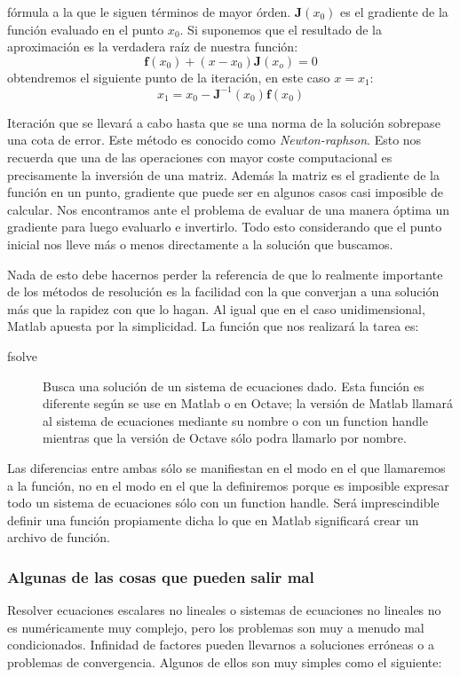 fórmula a la que le siguen términos de mayor órden.
$\mathbf{J}(x_{0})$ es el gradiente de la función evaluado en el punto
$x_{0}$. Si suponemos que el resultado de la aproximación es la
verdadera raíz de nuestra función:
$$
\mathbf{f}(x_{0})+(x-x_{0})\mathbf{J}(x_{o})=0$$ obtendremos el
siguiente punto de la iteración, en este caso $x=x_{1}$:
$$x_{1}=x_{0}-\mathbf{J}^{-1}(x_{0})\mathbf{f}(x_{0})$$


Iteración que se llevará a cabo hasta que se una norma de la solución
sobrepase una cota de error. Este método es conocido como
\emph{Newton-raphson}.  Esto nos recuerda que una de las operaciones
con mayor coste computacional es precisamente la inversión de una
matriz. Además la matriz es el gradiente de la función en un punto,
gradiente que puede ser en algunos casos casi imposible de calcular.
Nos encontramos ante el problema de evaluar de una manera óptima un
gradiente para luego evaluarlo e invertirlo. Todo esto considerando
que el punto inicial nos lleve más o menos directamente a la solución
que buscamos.

Nada de esto debe hacernos perder la referencia de que lo realmente
importante de los métodos de resolución es la facilidad con la que
converjan a una solución más que la rapidez con que lo hagan. Al igual
que en el caso unidimensional, Matlab apuesta por la simplicidad.  La
función que nos realizará la tarea es:

\begin{description}
\item [fsolve]Busca una solución de un sistema de
  ecuaciones dado. Esta función es diferente según se use en Matlab o
  en Octave; la versión de Matlab llamará al sistema de ecuaciones
  mediante su nombre o con un function handle mientras que la versión
  de Octave sólo podra llamarlo por nombre.
\end{description}
Las diferencias entre ambas sólo se manifiestan en el modo en el que
llamaremos a la función, no en el modo en el que la definiremos porque
es imposible expresar todo un sistema de ecuaciones sólo con un
function handle. Será imprescindible definir una función propiamente
dicha lo que en Matlab significará crear un archivo de función.


\subsubsection{Algunas de las cosas que pueden salir mal}

Resolver ecuaciones escalares no lineales o sistemas de ecuaciones no
lineales no es numéricamente muy complejo, pero los problemas son muy
a menudo mal condicionados. Infinidad de factores pueden llevarnos a
soluciones erróneas o a problemas de convergencia. Algunos de ellos
son muy simples como el siguiente:


